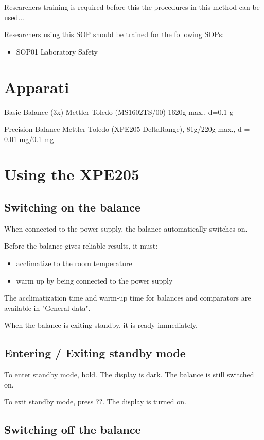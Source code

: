 \documentclass[12pt]{../SOP4_alpha}\usepackage[]{graphicx}\usepackage[]{xcolor}
\begin{document}
\NP Researchers training is required before this the procedures in this method can be used... 

\NP Researchers using this SOP should be trained for the following SOPs:

\begin{itemize}
  \item SOP01 Laboratory Safety
\end{itemize} 

\section{Apparati}

\NP Basic Balance (3x) Mettler Toledo (MS1602TS/00) 1620g max., d=0.1 g

\NP Precision Balance Mettler Toledo (XPE205 DeltaRange), 81g/220g max., d = 0.01 mg/0.1 mg

\section{Using the XPE205}

\subsection{Switching on the balance}

\NP When connected to the power supply, the balance automatically switches on.

\NP Before the balance gives reliable results, it must:
\begin{itemize}
\item acclimatize to the room temperature
\item warm up by being connected to the power supply
\end{itemize}
The acclimatization time and warm-up time for balances and comparators are available in "General data".

\NP When the balance is exiting standby, it is ready immediately.

\subsection{Entering / Exiting standby mode}

\NP To enter standby mode, hold. The display is dark. The balance is still switched on.

\NP To exit standby mode, press ??. The display is turned on.

\subsection{Switching off the balance}
\end{document}
